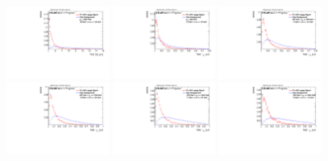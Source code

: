 \begin{figure}
\includegraphics[width=0.3\textwidth]{sascha_input/Appendix/Distributions/w/distributions/beta2/h_assisted_tj_D2_2_bin6.pdf}
\bigskip 
\includegraphics[width=0.3\textwidth]{sascha_input/Appendix/Distributions/w/distributions/beta2/h_assisted_tj_nSub21_2_bin1.pdf} \hspace{1mm}
\includegraphics[width=0.3\textwidth]{sascha_input/Appendix/Distributions/w/distributions/beta2/h_assisted_tj_nSub21_2_bin2.pdf} \hspace{1mm}
\includegraphics[width=0.3\textwidth]{sascha_input/Appendix/Distributions/w/distributions/beta2/h_assisted_tj_nSub21_2_bin3.pdf} 
\bigskip
\includegraphics[width=0.3\textwidth]{sascha_input/Appendix/Distributions/w/distributions/beta2/h_assisted_tj_nSub21_2_bin4.pdf} \hspace{6mm}
\includegraphics[width=0.3\textwidth]{sascha_input/Appendix/Distributions/w/distributions/beta2/h_assisted_tj_nSub21_2_bin5.pdf} \hspace{6mm}

\end{figure}
